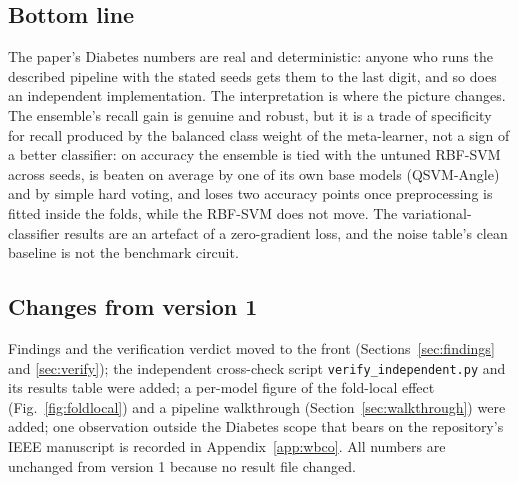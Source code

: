 \documentclass[11pt,a4paper]{article}
\newcommand{\code}[1]{\texttt{\small #1}}
\begin{document}
\subsection{Bottom line}
The paper's Diabetes numbers are real and deterministic: anyone who runs the described pipeline with the stated seeds gets them to the last digit, and so does an independent implementation. The interpretation is where the picture changes. The ensemble's recall gain is genuine and robust, but it is a trade of specificity for recall produced by the balanced class weight of the meta-learner, not a sign of a better classifier: on accuracy the ensemble is tied with the untuned RBF-SVM across seeds, is beaten on average by one of its own base models (QSVM-Angle) and by simple hard voting, and loses two accuracy points once preprocessing is fitted inside the folds, while the RBF-SVM does not move. The variational-classifier results are an artefact of a zero-gradient loss, and the noise table's clean baseline is not the benchmark circuit.

\subsection{Changes from version 1}
Findings and the verification verdict moved to the front (Sections~\ref{sec:findings} and \ref{sec:verify}); the independent cross-check script \code{verify\_independent.py} and its results table were added; a per-model figure of the fold-local effect (Fig.~\ref{fig:foldlocal}) and a pipeline walkthrough (Section~\ref{sec:walkthrough}) were added; one observation outside the Diabetes scope that bears on the repository's IEEE manuscript is recorded in Appendix~\ref{app:wbco}. All numbers are unchanged from version 1 because no result file changed.

\end{document}
